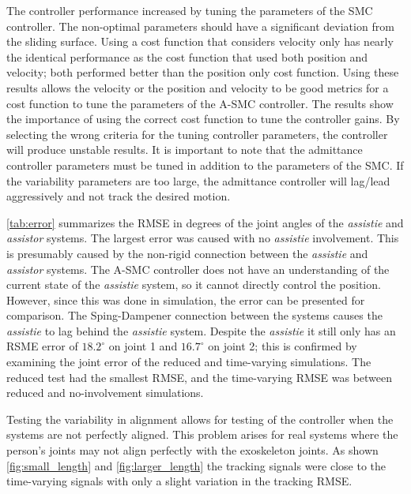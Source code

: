 The controller performance increased by tuning the parameters of the SMC controller. The non-optimal parameters should have a significant deviation from the sliding surface. Using a cost function that considers velocity only has nearly the identical performance as the cost function that used both position and velocity; both performed better than the position only cost function. Using these results allows the velocity or the position and velocity to be good metrics for a cost function to tune the parameters of the A-SMC controller. The results show the importance of using the correct cost function to tune the controller gains. By selecting the wrong criteria for the tuning controller parameters, the controller will produce unstable results. It is important to note that the admittance controller parameters must be tuned in addition to the parameters of the SMC. If the variability parameters are too large, the admittance controller will lag/lead aggressively and not track the desired motion. 

\autoref{tab:error} summarizes the RMSE in degrees of the joint angles of the \textit{assistie} and \textit{assistor} systems. The largest error was caused with no  \textit{assistie} involvement. This is presumably caused by the non-rigid connection between the  \textit{assistie} and \textit{assistor} systems. The A-SMC controller does not have an understanding of the current state of the \textit{assistie} system, so it cannot directly control the position. However, since this was done in simulation, the error can be presented for comparison. The Sping-Dampener connection between the systems causes the \textit{assistie} to lag behind the \textit{assistie} system. Despite the \textit{assistie} it still only has an RSME error of $18.2^{\circ}$ on joint 1 and $16.7^{\circ}$ on joint 2; this is confirmed by examining the joint error of the reduced and time-varying simulations. The reduced test had the smallest RMSE, and the time-varying RMSE was between reduced and no-involvement simulations. 


Testing the variability in alignment allows for testing of the controller when the systems are not perfectly aligned. This problem arises for real systems where the person's joints may not align perfectly with the exoskeleton joints. As shown \autoref{fig:small_length} and \autoref{fig:larger_length} the tracking signals were close to the time-varying signals with only a slight variation in the tracking RMSE.


